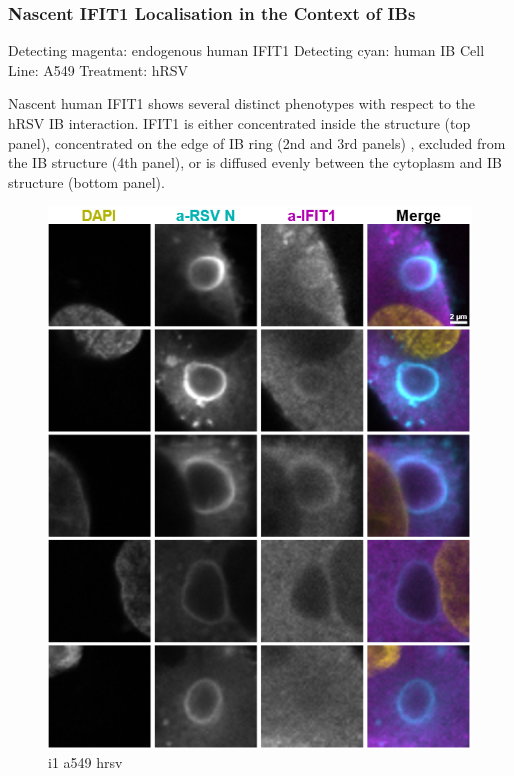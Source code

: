 \subsubsection{Nascent IFIT1 Localisation in the Context of IBs} \label{Nascent IFIT1 Localisation in the Context of IBs}
Detecting magenta: endogenous human IFIT1 \newline
Detecting cyan: human IB \newline
Cell Line: A549 \newline
Treatment: hRSV \newline

Nascent human IFIT1 shows several distinct phenotypes with respect to the hRSV IB interaction. IFIT1 is either concentrated inside the structure (top panel), concentrated on the edge of IB ring (2nd and 3rd panels)  , excluded from the IB structure (4th panel),  or is diffused evenly between the cytoplasm and IB structure (bottom panel).

\begin{figure}
    \centering
    \includegraphics[width=1\linewidth]{09. Chapter 4/Figs/03. IFIT1/04. human infection.png}
    \caption[i1 a549 hrsv]{i1 a549 hrsv}
    \label{fig:i1 a549 hrsv}
\end{figure}


